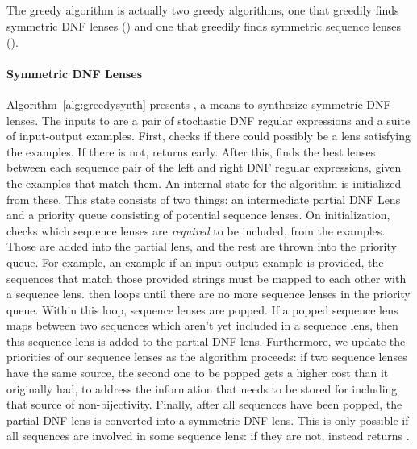 \documentclass[acmsmall,screen,anonymous]{acmart}
\begin{document}
\subsection{\GreedySynth}
\label{subsec:greedy-synth}

The greedy algorithm is actually two greedy algorithms, one that greedily finds
symmetric DNF lenses (\GreedySynth) and one that greedily finds symmetric
sequence lenses (\GreedySeqSynth).

\paragraph*{Symmetric DNF Lenses} Algorithm~\ref{alg:greedysynth} presents
\GreedySynth, a means to synthesize symmetric DNF lenses. The inputs to
\GreedySynth are a pair of stochastic DNF regular expressions and a suite of
input-output examples. First,  checks if there could possibly be
a lens satisfying the examples. If there is not, \GreedySynth returns \None
early. After this, \GreedySynth finds the best lenses between each sequence pair
of the left and right DNF regular expressions, given the examples that match
them. An internal state for the algorithm is initialized from these. This state
consists of two things: an intermediate partial DNF Lens and a priority queue
consisting of potential sequence lenses. On initialization, \GreedySynth checks
which sequence lenses are \emph{required} to be included, from the examples.
Those are added into the partial lens, and the rest are thrown into the priority
queue. For example, an example if an input output example is provided, the
sequences that match those provided strings must be mapped to each other with a
sequence lens. \GreedySynth then loops until there are no more sequence lenses
in the priority queue. Within this loop, sequence lenses are popped. If a popped
sequence lens maps between two sequences which aren't yet included in a sequence
lens, then this sequence lens is added to the partial DNF lens. Furthermore, we
update the priorities of our sequence lenses as the algorithm proceeds: if two
sequence lenses have the same source, the second one to be popped gets a higher
cost than it originally had, to address the information that needs to be stored
for including that source of non-bijectivity. Finally, after all sequences have
been popped, the partial DNF lens is converted into a symmetric DNF lens. This
is only possible if all sequences are involved in some sequence lens: if they
are not,  instead returns \None.
\end{document}

